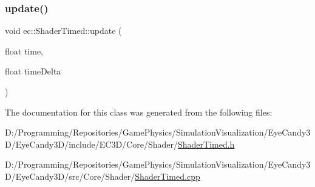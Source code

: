 \subsubsection{\texorpdfstring{update()}{update()}}
{\footnotesize\ttfamily void ec\+::\+Shader\+Timed\+::update (\begin{DoxyParamCaption}\item[{float}]{time,  }\item[{float}]{time\+Delta }\end{DoxyParamCaption})\hspace{0.3cm}{\ttfamily [virtual]}}



The documentation for this class was generated from the following files\+:\begin{DoxyCompactItemize}
\item 
D\+:/\+Programming/\+Repositories/\+Game\+Physics/\+Simulation\+Visualization/\+Eye\+Candy3\+D/\+Eye\+Candy3\+D/include/\+E\+C3\+D/\+Core/\+Shader/\mbox{\hyperlink{_shader_timed_8h}{Shader\+Timed.\+h}}\item 
D\+:/\+Programming/\+Repositories/\+Game\+Physics/\+Simulation\+Visualization/\+Eye\+Candy3\+D/\+Eye\+Candy3\+D/src/\+Core/\+Shader/\mbox{\hyperlink{_shader_timed_8cpp}{Shader\+Timed.\+cpp}}\end{DoxyCompactItemize}

